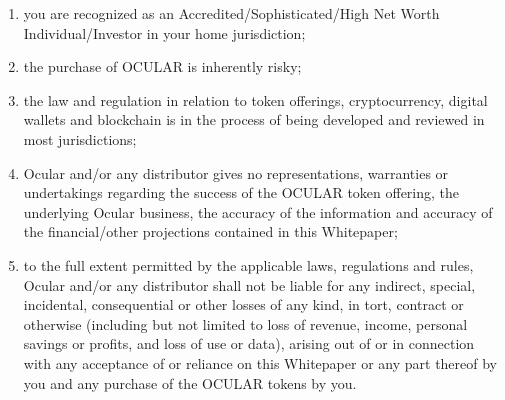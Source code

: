 \documentclass[a4paper]{article}
\begin{document}
\begin{enumerate}
\item you are recognized as an Accredited/Sophisticated/High Net Worth Individual/Investor in your home jurisdiction; 
\item the purchase of OCULAR is inherently risky; 
\item the law and regulation in relation to token offerings, cryptocurrency, digital wallets and blockchain is in the process of being developed and reviewed in most jurisdictions;
\item Ocular and/or any distributor gives no representations, warranties or undertakings regarding the success of the OCULAR token offering, the underlying Ocular business, the accuracy of the information and accuracy of the financial/other projections contained in this Whitepaper;
\item to the full extent permitted by the applicable laws, regulations and rules, Ocular and/or any distributor shall not be liable for any indirect, special, incidental, consequential or other losses of any kind, in tort, contract or otherwise (including but not limited to loss of revenue, income, personal savings or profits, and loss of use or data), arising out of or in connection with any acceptance of or reliance on this Whitepaper or any part thereof by you and any purchase of the OCULAR tokens by you.
\end{enumerate}
\end{document}

